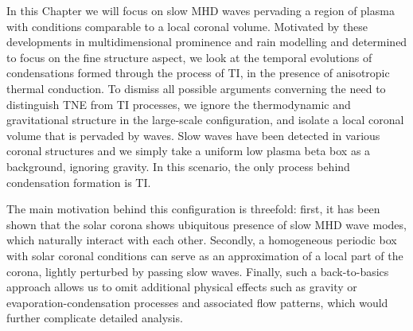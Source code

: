 In this Chapter we will focus on slow MHD waves pervading a region of plasma with conditions comparable to a local coronal volume. Motivated by these developments in multidimensional prominence and rain modelling and determined to focus on the fine structure aspect, we look at the temporal evolutions of condensations formed through the process of TI, in the presence of anisotropic thermal conduction. To dismiss all possible arguments converning the need to distinguish TNE from TI processes, we ignore the thermodynamic and gravitational structure in the large-scale configuration, and isolate a local coronal volume that is pervaded by waves. Slow waves have been detected in various coronal structures \citep{roberts2006,demoortel2015} and we simply take a uniform low plasma beta box as a background, ignoring gravity. In this scenario, the only process behind condensation formation is TI.

The main motivation behind this configuration is threefold: first, it has been shown that the solar corona shows ubiquitous presence of slow MHD wave modes, which naturally interact with each other. Secondly, a homogeneous periodic box with solar coronal conditions can serve as an approximation of a local part of the corona, lightly perturbed by passing slow waves. Finally, such a back-to-basics approach allows us to omit additional physical effects such as gravity or evaporation-condensation processes and associated flow patterns, which would further complicate detailed analysis.

